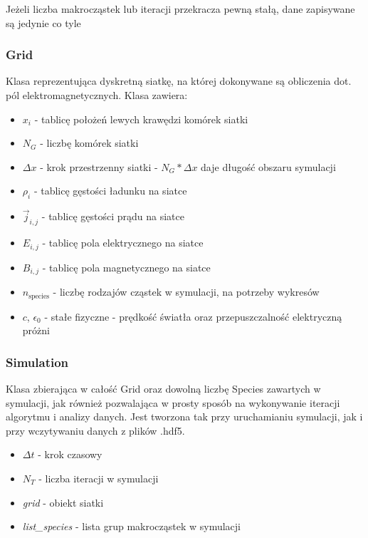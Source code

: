     Jeżeli liczba makrocząstek lub iteracji przekracza pewną stałą, dane zapisywane są jedynie co tyle

    \subsubsection{Grid}
    Klasa reprezentująca dyskretną siatkę, na której dokonywane są obliczenia dot. pól elektromagnetycznych.
    Klasa zawiera:
    \begin{itemize}
        \item $x_i$ - tablicę położeń lewych krawędzi komórek siatki
        \item $N_G$ - liczbę komórek siatki
        \item $\Delta x$ - krok przestrzenny siatki - $N_G * \Delta x$ daje długość obszaru symulacji
        \item $\rho_i$ - tablicę gęstości ładunku na siatce
        \item $\vec{j}_{i,j}$ - tablicę gęstości prądu na siatce
        \item $E_{i,j}$ - tablicę pola elektrycznego na siatce
        \item $B_{i,j}$ - tablicę pola magnetycznego na siatce
        \item $n_{\text{species}}$ - liczbę rodzajów cząstek w symulacji, na potrzeby wykresów
        \item $c$, $\epsilon_0$ - stałe fizyczne - prędkość światła oraz przepuszczalność elektryczną próżni %
    \end{itemize}


    \subsubsection{Simulation}
    Klasa zbierająca w całość Grid oraz dowolną liczbę Species zawartych w symulacji, jak również
    pozwalająca w prosty sposób na wykonywanie iteracji algorytmu i analizy danych. Jest tworzona tak przy
    uruchamianiu symulacji, jak i przy wczytywaniu danych z plików .hdf5.

    \begin{itemize}
        \item $\Delta t$ - krok czasowy
        \item $N_T$ - liczba iteracji w symulacji
        \item \emph{grid} - obiekt siatki
        \item \emph{list\_species} - lista grup makrocząstek w symulacji
    \end{itemize}

